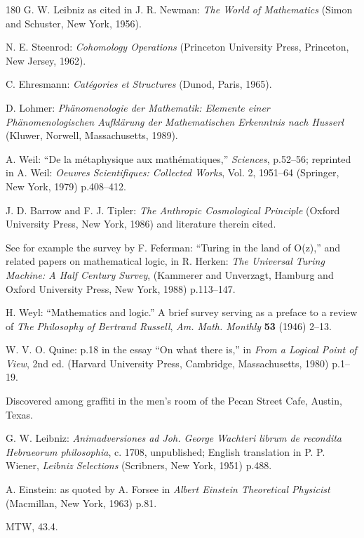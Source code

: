 \documentclass[11pt]{article}
\begin{document}
\begin{thebibliography}{180}
		G. W. Leibniz as cited in J. R. Newman: \emph{The World of Mathematics} (Simon and Schuster, New York, 1956).
		
		N. E. Steenrod: \emph{Cohomology Operations} (Princeton University Press, Princeton, New Jersey, 1962).
		
		C. Ehresmann: \emph{Catégories et Structures} (Dunod, Paris, 1965).
		
		D. Lohmer: \emph{Phänomenologie der Mathematik: Elemente einer Phänomenologischen Aufklärung der Mathematischen Erkenntnis nach Husserl} (Kluwer, Norwell, Massachusetts, 1989).
		
		A. Weil: ``De la métaphysique aux mathématiques,'' \emph{Sciences}, p.52--56; reprinted in A. Weil: \emph{Oeuvres Scientifiques: Collected Works}, Vol. 2, 1951--64 (Springer, New York, 1979) p.408--412.
		
		J. D. Barrow and F. J. Tipler: \emph{The Anthropic Cosmological Principle} (Oxford University Press, New York, 1986) and literature therein cited.
		
		See for example the survey by F. Feferman: ``Turing in the land of O(z),'' and related papers on mathematical logic, in R. Herken: \emph{The Universal Turing Machine: A Half Century Survey}, (Kammerer and Unverzagt, Hamburg and Oxford University Press, New York, 1988) p.113--147.
		
		H. Weyl: ``Mathematics and logic.'' A brief survey serving as a preface to a review of \emph{The Philosophy of Bertrand Russell}, \emph{Am. Math. Monthly} \textbf{53} (1946) 2--13.
		
		W. V. O. Quine: p.18 in the essay ``On what there is,'' in \emph{From a Logical Point of View}, 2nd ed. (Harvard University Press, Cambridge, Massachusetts, 1980) p.1--19.
		
		Discovered among graffiti in the men's room of the Pecan Street Cafe, Austin, Texas.
		
		G. W. Leibniz: \emph{Animadversiones ad Joh. George Wachteri librum de recondita Hebraeorum philosophia}, c. 1708, unpublished; English translation in P. P. Wiener, \emph{Leibniz Selections} (Scribners, New York, 1951) p.488.
		
		A. Einstein: as quoted by A. Forsee in \emph{Albert Einstein Theoretical Physicist} (Macmillan, New York, 1963) p.81.
		
		MTW, 43.4.
		

\end{thebibliography}
\end{document}
